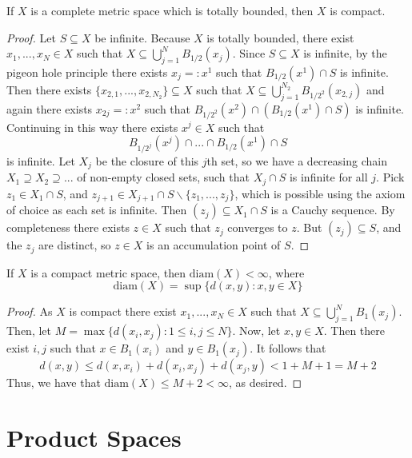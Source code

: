\begin{prop}\label{prop:2.3.7}
    If $X$ is a complete metric space which is totally bounded, then $X$ is compact.
\end{prop}
\begin{proof}
    Let $S \subseteq X$ be infinite. Because $X$ is totally bounded, there exist $x_1,...,x_N \in X$ such that $X \subseteq \bigcup_{j=1}^NB_{1/2}(x_j)$. Since $S \subseteq X$ is infinite, by the pigeon hole principle there exists $x_j =: x^1$ such that $B_{1/2}(x^1)\cap S$ is infinite. Then there exists $\{x_{2,1},...,x_{2,N_2}\} \subseteq X$ such that $X \subseteq \bigcup_{j=1}^{N_2}B_{1/2^2}(x_{2,j})$ and again there exists $x_{2j} =: x^2$ such that $B_{1/2^2}(x^2) \cap (B_{1/2}(x^1)\cap S)$ is infinite. Continuing in this way there exists $x^j \in X$ such that \begin{equation*}
        B_{1/2^j}(x^j)\cap ... \cap B_{1/2}(x^1)\cap S
    \end{equation*}
    is infinite. Let $X_j$ be the closure of this $j$th set, so we have a decreasing chain $X_1 \supseteq X_2 \supseteq ...$ of non-empty closed sets, such that $X_j \cap S$ is infinite for all $j$. Pick $z_1\in X_1\cap S$, and $z_{j+1} \in X_{j+1}\cap S\backslash \{z_1,...,z_j\}$, which is possible using the axiom of choice as each set is infinite. Then $(z_j) \subseteq X_1 \cap S$ is a Cauchy sequence. By completeness there exists $z \in X$ such that $z_j$ converges to $z$. But $(z_j) \subseteq S$, and the $z_j$ are distinct, so $z \in X$ is an accumulation point of $S$.
\end{proof}

\begin{prop}\label{prop:2.3.8}
    If $X$ is a compact metric space, then $\text{diam}(X) < \infty$, where \begin{equation*}
        \text{diam}(X) = \sup\{d(x,y):x,y \in X\}
    \end{equation*}
\end{prop}
\begin{proof}
     As $X$ is compact there exist $x_1,...,x_N \in X$ such that $X \subseteq \bigcup_{j=1}^NB_1(x_j)$. Then, let $M = \max\{d(x_i,x_j):1\leq i,j\leq N\}$. Now, let $x,y \in X$. Then there exist $i,j$ such that $x \in B_1(x_i)$ and $y \in B_1(x_j)$. It follows that $$d(x,y) \leq d(x,x_i) + d(x_i,x_j) + d(x_j,y) < 1+M+1 = M+2$$ Thus, we have that $\text{diam}(X) \leq M+2 < \infty$, as desired.
\end{proof}

\section{Product Spaces}


